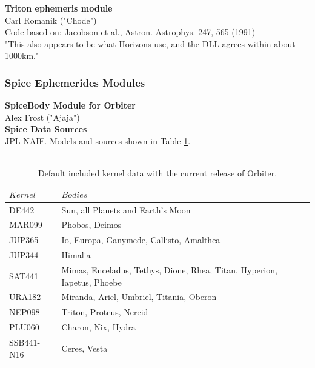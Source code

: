 \documentclass[Orbiter User Manual.tex]{subfiles}
\begin{document}
\textbf{Triton ephemeris module}\\
Carl Romanik ("Chode")\\
Code based on: Jacobson et al., Astron. Astrophys. 247, 565 (1991)\\
"This also appears to be what Horizons use, and the DLL agrees within about
1000km."

\subsubsection{Spice Ephemerides Modules}
\textbf{SpiceBody Module for Orbiter}\\
Alex Frost ("Ajaja")\\

\textbf{Spice Data Sources}\\
JPL NAIF. Models and sources shown in Table \ref{tab:spicedata}.\\
\\
\begin{table}[]
\begin{tabular}{|l|l|}
\hline
$Kernel$             & $Bodies$                                                                \\ \hline
DE442\cite{DE440}\cite{DE442}     & Sun, all Planets and Earth's Moon                          \\ \hline
MAR099\cite{MAR099}  & Phobos, Deimos                                                          \\ \hline
JUP365\cite{JUP365}  & Io, Europa, Ganymede, Callisto, Amalthea                                \\ \hline
JUP344\cite{JUP344}  & Himalia                                                                 \\ \hline
SAT441\cite{SAT441}  & Mimas, Enceladus, Tethys, Dione, Rhea, Titan, Hyperion, Iapetus, Phoebe \\ \hline
URA182\cite{URA182}  & Miranda, Ariel, Umbriel, Titania, Oberon                                \\ \hline
NEP098\cite{NEP098}  & Triton, Proteus, Nereid                                                 \\ \hline
PLU060\cite{PLU060}  & Charon, Nix, Hydra                                                      \\ \hline
SSB441-N16\cite{SSB441-N16}    & Ceres, Vesta                                                  \\ \hline
\end{tabular}
\caption{Default included kernel data with the current release of Orbiter.}
\label{tab:spicedata}
\end{table}
\end{document}
